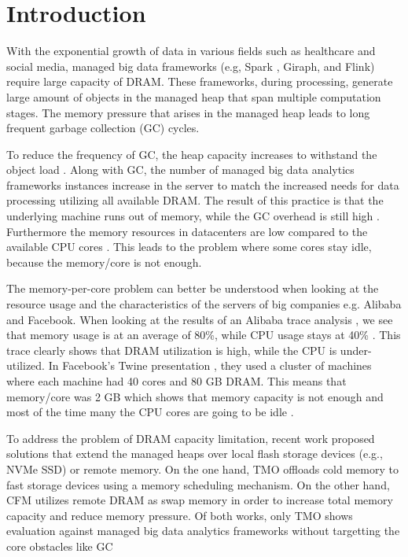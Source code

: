 \section{Introduction}
\label{sec:intro}

With the exponential growth of data in various fields such as
healthcare and social media, managed big data frameworks (e.g, Spark
\cite{Spark}, Giraph,
and Flink) require large capacity of DRAM. These frameworks, during
processing, generate large amount of objects in the managed heap that
span multiple computation stages. The memory pressure that arises in
the managed heap leads to long frequent garbage collection (GC)
cycles.

To reduce the frequency of GC, the heap capacity increases to
withstand the object load . Along with GC, the number of managed big
data analytics frameworks instances increase in the server to match
the increased needs for data processing utilizing all available DRAM.
The result of this practice is that the underlying machine runs out of
memory, while the GC overhead is still high . Furthermore the memory
resources in datacenters are low compared to the available CPU cores
.
This leads to the problem where some cores stay idle, because the
memory/core is not enough.

The memory-per-core problem can better be understood when looking at
the resource usage and the characteristics of the servers of big
companies e.g. Alibaba and Facebook. When looking at the results of an
Alibaba trace analysis \cite{Alibaba}, we see that memory usage is at
an average of 80\%, while CPU usage stays at 40\% . This trace clearly
shows that DRAM utilization is high, while the CPU is under-utilized.
In Facebook's Twine presentation \cite{Twine}, they used a cluster of
machines where each machine had 40 cores and 80 GB DRAM. This means
that memory/core was 2 GB which shows that memory capacity is not
enough and most of the time many the CPU cores are going to be idle
.

To address the problem of DRAM capacity limitation, recent work
proposed solutions that extend the managed heaps over local flash
storage devices (e.g., NVMe SSD) or remote memory. On the one hand,
TMO \cite{TMO} offloads cold memory to fast storage devices using
a memory scheduling mechanism. On the other hand, CFM \cite{CFM}
utilizes remote DRAM as swap memory in order to increase total memory capacity
and reduce memory pressure. Of both works, only TMO shows
evaluation against managed big data analytics frameworks without
targetting the core obstacles like GC 

